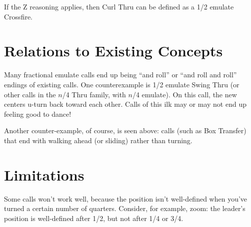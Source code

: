 \documentclass[11pt]{article}
\begin{document}

If the Z reasoning applies, then Curl Thru can be defined
as a 1/2 emulate Crossfire.

\section{Relations to Existing Concepts}

Many fractional emulate calls end up being ``and roll'' or ``and roll and
roll'' endings of existing calls.
One counterexample is 1/2 emulate Swing Thru
(or other calls in the $n$/4 Thru family, with $n$/4 emulate).
On this call, the new centers u-turn back toward each other.
Calls of this ilk may or may not end up feeling good to dance!

Another counter-example, of course, is seen above:
calls (such as Box Transfer) that end with walking ahead
(or sliding) rather than turning.

\section{Limitations}

Some calls won't work well, because the position isn't well-defined
when you've turned a certain number of quarters.  Consider, for
example, zoom: the leader's position is well-defined after 1/2, but
not after 1/4 or 3/4.
\end{document}
